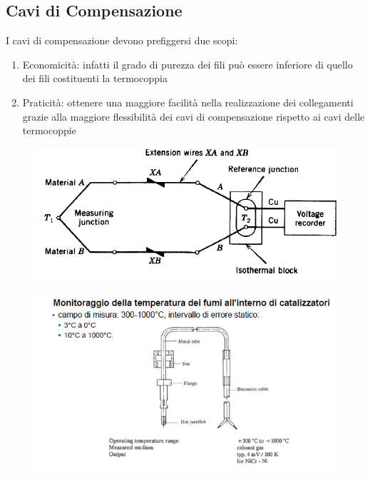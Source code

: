 \documentclass[a4paper, 15pt]{article}
\begin{document}
\subsection{Cavi di Compensazione}
\begin{adjustwidth}{2in}{}		
	I cavi di compensazione devono prefiggersi due scopi: 
	\begin{enumerate}
		\item Economicità: infatti il grado di purezza dei fili può essere inferiore di quello
		dei fili costituenti la termocoppia
		\item Praticità: ottenere una maggiore facilità nella realizzazione dei collegamenti grazie alla maggiore flessibilità dei cavi di compensazione rispetto ai cavi delle
		termocoppie
	\end{enumerate}
	\begin{figure}[H]
		\centering
		\includegraphics[width=0.3\linewidth]{immagini/screenshot032}
		\label{fig:screenshot032}
	\end{figure}
	\begin{figure}[H]
		\centering
		\includegraphics[width=0.7\linewidth]{immagini/screenshot033}
		\label{fig:screenshot033}
	\end{figure}
\end{adjustwidth}
\newpage
\end{document}
